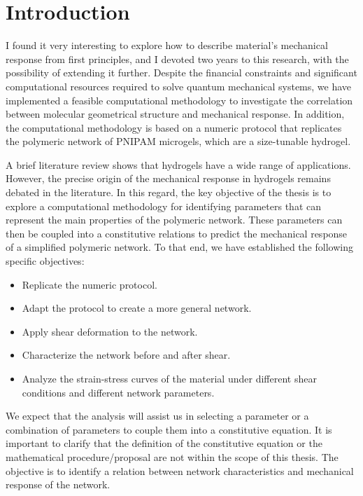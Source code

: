 \chapter{Introduction}\label{ch1:Intro}



I found it very interesting to explore how to describe material's mechanical response from first principles, and I devoted two years to this research, with the possibility of extending it further.
Despite the financial constraints and significant computational resources required to solve quantum mechanical systems, we have implemented a feasible computational methodology to investigate the correlation between molecular geometrical structure and mechanical response.
In addition, the computational methodology is based on a numeric protocol that replicates the polymeric network of PNIPAM microgels, which are a size-tunable hydrogel.

A brief literature review shows that hydrogels have a wide range of applications.
However, the precise origin of the mechanical response in hydrogels remains debated in the literature.
In this regard, the key objective of the thesis is to explore a computational methodology for identifying parameters that can represent the main properties of the polymeric network. 
These parameters can then be coupled into a constitutive relations to predict the mechanical response of a simplified polymeric network.
To that end, we have established the following specific objectives:
\begin{itemize}
    \item Replicate the numeric protocol.
    \item Adapt the protocol to create a more general network.
    \item Apply shear deformation to the network.
    \item Characterize the network before and after shear.
    \item Analyze the strain-stress curves of the material under different shear conditions and different network parameters.
\end{itemize}
We expect that the analysis will assist us in selecting a parameter or a combination of parameters to couple them into a constitutive equation.
It is important to clarify that the definition of the constitutive equation or the mathematical procedure/proposal are not within the scope of this thesis. 
The objective is to identify a relation between network characteristics and mechanical response of the network.

